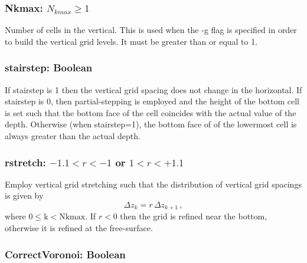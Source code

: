 \documentclass[12pt,oneside]{article}
\begin{document}
\subsubsection{Nkmax: $N_{kmax}\ge 1$}

Number of cells in the vertical.  This is used when the -g flag is
specified in order to build the vertical grid levels.  It must be
greater than or equal to 1.  

\subsubsection{stairstep: Boolean}

If stairstep is 1 then the vertical grid spacing does not change in
the horizontal. If stairstep is 0, then partial-stepping is employed and
the height of the bottom cell
is set such that the bottom face of the cell coincides with the actual
value of the depth. Otherwise (when stairstep=1), the bottom face of
of the lowermost cell is always greater than the actual depth.  

\subsubsection{rstretch: $-1.1 < r < -1$ or $1 < r < +1.1$}

Employ vertical grid stretching such that the distribution of vertical
grid spacings is given by
\[
\Delta z_k = r\,\Delta z_{k+1}\,,
\]
where $0\le \mbox{k} < \mbox{Nkmax}$.  If $r<0$ then the grid is refined near the
bottom, otherwise it is refined at the free-surface.

\subsubsection{CorrectVoronoi: Boolean}
\end{document}

